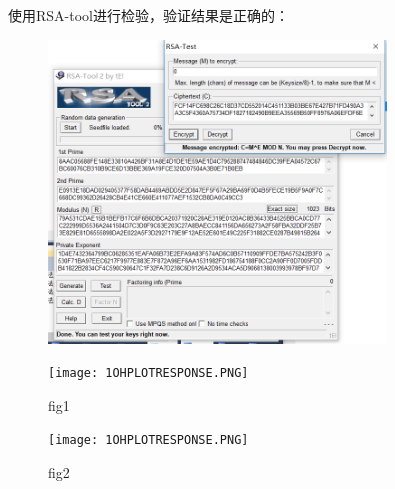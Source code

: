 \documentclass[UTF8,a4paper]{article}
\begin{document}
使用RSA-tool进行检验，验证结果是正确的：\par 





\begin{figure}[!ht]
	
	\centering
	\includegraphics[width=0.8\textwidth]{en.PNG}
	
	\label{fig:grade}
\end{figure}







\begin{figure}[htbp] 
	\begin{minipage}[t]{0.5\linewidth} 
		\centering 
		\texttt{[image: 1OHPLOTRESPONSE.PNG]}
		\caption{fig1} 
		\label{fig:side:a} 
	\end{minipage}%
	\begin{minipage}[t]{0.5\linewidth} 
		\centering 
		\texttt{[image: 1OHPLOTRESPONSE.PNG]}
		\caption{fig2} 
	\end{minipage} 
\end{figure}  
\end{document}
